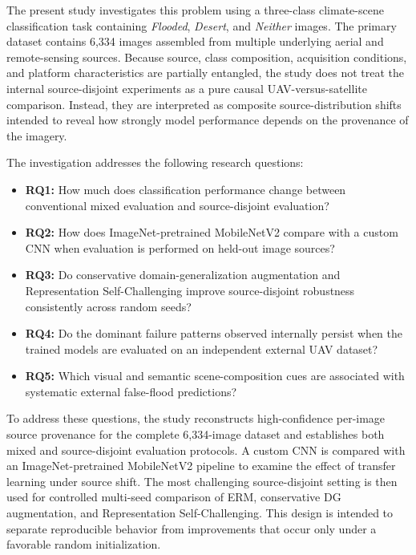 The present study investigates this problem using a three-class climate-scene classification task containing \emph{Flooded}, \emph{Desert}, and \emph{Neither} images. The primary dataset contains 6,334 images assembled from multiple underlying aerial and remote-sensing sources. Because source, class composition, acquisition conditions, and platform characteristics are partially entangled, the study does not treat the internal source-disjoint experiments as a pure causal UAV-versus-satellite comparison. Instead, they are interpreted as composite source-distribution shifts intended to reveal how strongly model performance depends on the provenance of the imagery.

The investigation addresses the following research questions:

\begin{itemize}
    \item \textbf{RQ1:} How much does classification performance change between conventional mixed evaluation and source-disjoint evaluation?

    \item \textbf{RQ2:} How does ImageNet-pretrained MobileNetV2 compare with a custom CNN when evaluation is performed on held-out image sources?

    \item \textbf{RQ3:} Do conservative domain-generalization augmentation and Representation Self-Challenging improve source-disjoint robustness consistently across random seeds?

    \item \textbf{RQ4:} Do the dominant failure patterns observed internally persist when the trained models are evaluated on an independent external UAV dataset?

    \item \textbf{RQ5:} Which visual and semantic scene-composition cues are associated with systematic external false-flood predictions?
\end{itemize}

To address these questions, the study reconstructs high-confidence per-image source provenance for the complete 6,334-image dataset and establishes both mixed and source-disjoint evaluation protocols. A custom CNN is compared with an ImageNet-pretrained MobileNetV2 pipeline to examine the effect of transfer learning under source shift. The most challenging source-disjoint setting is then used for controlled multi-seed comparison of ERM, conservative DG augmentation, and Representation Self-Challenging. This design is intended to separate reproducible behavior from improvements that occur only under a favorable random initialization.

